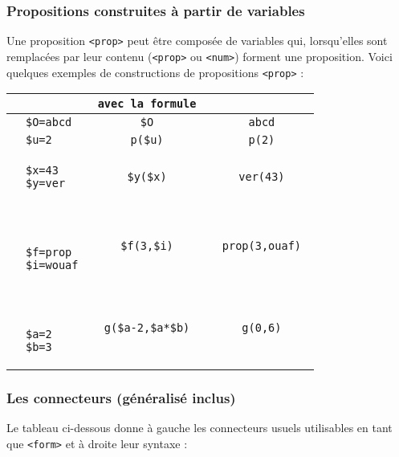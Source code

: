 \subsubsection{Propositions construites à partir de variables}
Une proposition \texttt{<prop>} peut être composée de variables qui, lorsqu'elles sont remplacées par leur contenu (\texttt{<prop>} ou \texttt{<num>}) forment une proposition. Voici quelques exemples de constructions de propositions \texttt{<prop>} :\\

\begin{center}
\begin{tabular}{r >{\tt}V{3cm} >{\tt}c >{\tt}c} \toprule
& & {\normalfont avec la formule} &  \\ \midrule
 &\$O=abcd & \$O & abcd \\ \hline
 &\$u=2 & p(\$u) & p(2) \\ \hline
 &\begin{verbatim}
$x=43
$y=ver\end{verbatim} & \$y(\$x) & ver(43) \\ \hline
& \begin{verbatim}
$f=prop
$i=wouaf\end{verbatim} & \$f(3,\$i) & prop(3,ouaf) \\ \hline
& \begin{verbatim}
$a=2
$b=3\end{verbatim} & g(\$a-2,\$a*\$b) & g(0,6) \\
\end{tabular}
\end{center}

\subsubsection{Les connecteurs (généralisé inclus)}

Le tableau ci-dessous donne à gauche les connecteurs usuels utilisables en tant que \texttt{<form>} et à droite leur syntaxe \touist :

